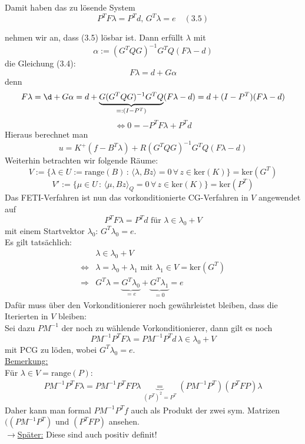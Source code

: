 Damit haben das zu lösende System
\[ \boxed{P^TF\lambda =P^T d,\, G^T\lambda =e} \quad (3.5)  \]

nehmen wir an, dass (3.5) lösbar ist. Dann erfüllt $\lambda$ mit 
\[ \alpha := (G^TQG)^{-1} G^TQ (F\lambda -d) \]
die Gleichung (3.4):
\[ F\lambda = d+G\alpha \]
denn
\[ F\lambda = \d+G\alpha = d + \underbrace{G  (G^TQG)^{-1} G^TQ}_{=: (I-P^T)} (F\lambda -d) = d + (I-P^T)(F\lambda -d) \]
\[ \Leftrightarrow 0= -P^TF\lambda +P^Td \]
Hieraus berechnet man 
\[ u=K^+ (f-B^T\lambda) + R(G^T Q G)^{-1} G^TQ (F\lambda -d) \]
Weiterhin betrachten wir folgende Räume:
\[V:= \{ \lambda \in U :=\text{range} (B) \, :\,  \langle \lambda, Bz \rangle =0 \, \forall \, z \in \text{ker}(K) \} = \text{ker} (G^T) \]
\[V' := \{ \mu \in U \, :\,  \langle \mu, Bz \rangle_Q =0 \,  \forall \, z \in \text{ker}(K) \} = \text{ker} (P^T) \]
Das  FETI-Verfahren ist nun das vorkonditionierte CG-Verfahren in $V$ angewendet auf
\[ P^TF\lambda = P^T d \text{ für } \lambda \in \lambda_0 +V \]
mit einem Startvektor $\lambda_0: \, G^T\lambda_0=e $.\\

Es gilt tatsächlich:
\begin{align*}
  &	\lambda \in \lambda_0 + V \\
  \Leftrightarrow & \lambda=\lambda_0 + \lambda_1 \text{ mit } \lambda_1 \in V=\text{ker}(G^T) \\
  \Rightarrow & G^T\lambda = \underbrace{G^T \lambda_0}_{=e} + \underbrace{G^T \lambda_1}_{=0} =e
\end{align*}
Dafür muss über den Vorkonditionierer noch gewährleistet bleiben, dass die Iterierten in $V$ bleiben:\\
Sei dazu $PM^{-1}$ der noch zu wählende Vorkonditionierer, dann gilt es noch
\[ PM^{-1}P^TF\lambda = PM^{-1} P^T d \, \lambda \in \lambda_0 + V \]
mit PCG zu löden, wobei $G^T\lambda_0 = e$.\\
\underline{Bemerkung:}\\
Für $\lambda \in V=\text{range} (P)$:
\begin{align*}
PM^{-1}P^TF\lambda = PM^{-1}P^T FP \lambda \underbrace{=}_{(P^T)^2=P^T} (PM^{-1}P^T)(P^TFP)\lambda
\end{align*}
Daher kann man formal $PM^{-1}P^Tf$ auch als Produkt der zwei sym. Matrizen $( (PM^{-1}P^T)$ und $(P^TFP)$ ansehen.\\
$\rightarrow$\underline{Später:} Diese sind auch positiv definit!\\
\\

